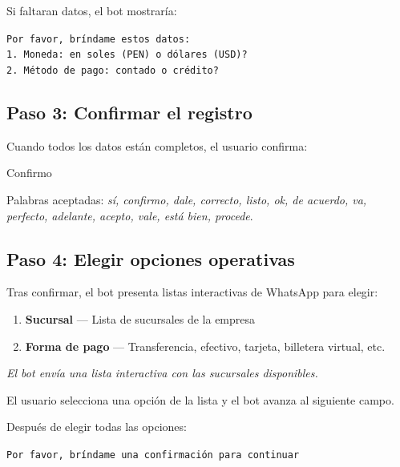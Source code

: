 \documentclass[12pt,a4paper]{article}
\begin{document}
Si faltaran datos, el bot mostrar\'ia:

\begin{mensajebot}
\texttt{Por favor, br\'indame estos datos:} \\
\texttt{1. Moneda: en soles (PEN) o d\'olares (USD)?} \\
\texttt{2. M\'etodo de pago: contado o cr\'edito?}
\end{mensajebot}

\subsection{Paso 3: Confirmar el registro}

Cuando todos los datos est\'an completos, el usuario confirma:

\begin{mensajeusuario}
Confirmo
\end{mensajeusuario}

Palabras aceptadas: \textit{s\'i, confirmo, dale, correcto, listo, ok, de acuerdo, va, perfecto, adelante, acepto, vale, est\'a bien, procede}.

\subsection{Paso 4: Elegir opciones operativas}

Tras confirmar, el bot presenta listas interactivas de WhatsApp para elegir:

\begin{enumerate}
    \item \textbf{Sucursal} --- Lista de sucursales de la empresa
    \item \textbf{Forma de pago} --- Transferencia, efectivo, tarjeta, billetera virtual, etc.
\end{enumerate}

\begin{mensajebot}
\textit{El bot env\'ia una lista interactiva con las sucursales disponibles.}
\end{mensajebot}

El usuario selecciona una opci\'on de la lista y el bot avanza al siguiente campo.

Despu\'es de elegir todas las opciones:

\begin{mensajebot}
\texttt{Por favor, br\'indame una confirmaci\'on para continuar}
\end{mensajebot}
\end{document}
